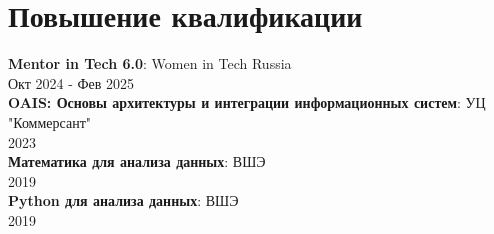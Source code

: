 \documentclass[letterpaper,11pt,english,russian]{article}
\begin{document}
\section{Повышение квалификации}
 \begin{itemize}[leftmargin=0.15in, label={}]
    \small{\item{
     \textbf{Mentor in Tech 6.0}{: Women in Tech Russia\\ Окт 2024 - Фев 2025} \\
     \textbf{OAIS: Основы архитектуры и интеграции информационных систем}{: УЦ "Коммерсант"\\ 2023} \\
     \textbf{Математика для анализа данных}{: ВШЭ\\ 2019} \\
     \textbf{Python для анализа данных}{: ВШЭ\\ 2019}
    }}
 \end{itemize}


\end{document}

